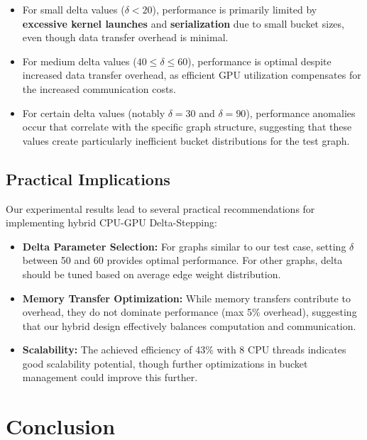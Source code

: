\documentclass{article}
\begin{document}
\begin{itemize}
    \item For small delta values ($\delta < 20$), performance is primarily limited by \textbf{excessive kernel launches} and \textbf{serialization} due to small bucket sizes, even though data transfer overhead is minimal.
    
    \item For medium delta values ($40 \leq \delta \leq 60$), performance is optimal despite increased data transfer overhead, as efficient GPU utilization compensates for the increased communication costs.
    
    \item For certain delta values (notably $\delta=30$ and $\delta=90$), performance anomalies occur that correlate with the specific graph structure, suggesting that these values create particularly inefficient bucket distributions for the test graph.
\end{itemize}

\subsection*{Practical Implications}

Our experimental results lead to several practical recommendations for implementing hybrid CPU-GPU Delta-Stepping:

\begin{itemize}
    \item \textbf{Delta Parameter Selection:} For graphs similar to our test case, setting $\delta$ between 50 and 60 provides optimal performance. For other graphs, delta should be tuned based on average edge weight distribution.
    
    \item \textbf{Memory Transfer Optimization:} While memory transfers contribute to overhead, they do not dominate performance (max 5\% overhead), suggesting that our hybrid design effectively balances computation and communication.
    
    \item \textbf{Scalability:} The achieved efficiency of 43\% with 8 CPU threads indicates good scalability potential, though further optimizations in bucket management could improve this further.
\end{itemize}

\section*{Conclusion}
\end{document}
